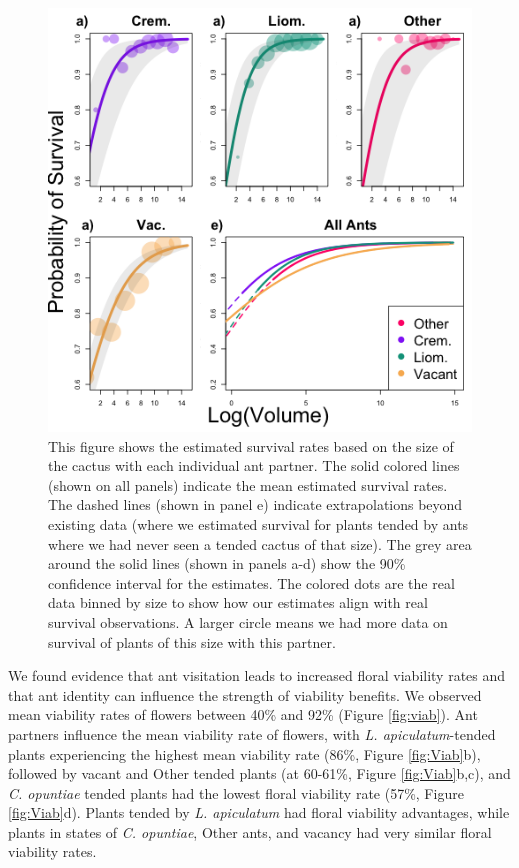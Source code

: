 \documentclass[11pt]{article}
\begin{document}
\begin{figure}[H]
\includegraphics[width=0.95\linewidth]{Figures/survival_plot.png}
\caption{This figure shows the estimated survival rates based on the size of the cactus with each individual ant partner. The solid colored lines (shown on all panels) indicate the mean estimated survival rates. The dashed lines (shown in panel e) indicate extrapolations beyond existing data (where we estimated survival for plants tended by ants where we had never seen a tended cactus of that size). The grey area around the solid lines (shown in panels a-d) show the 90\% confidence interval for the estimates. The colored dots are the real data binned by size to show how our estimates align with real survival observations. A larger circle means we had more data on survival of plants of this size with this partner.}
\label{fig:Surv}
\end{figure}

We found evidence that ant visitation leads to increased floral viability rates and that ant identity can influence the strength of viability benefits.
We observed mean viability rates of flowers between 40\% and 92\% (Figure \ref{fig:viab}).
Ant partners influence the mean viability rate of flowers, with \textit{L. apiculatum}-tended plants experiencing the highest mean viability rate (86\%, Figure \ref{fig:Viab}b), followed by vacant and Other tended plants (at 60-61\%, Figure \ref{fig:Viab}b,c), and \textit{C. opuntiae} tended plants had the lowest floral viability rate (57\%, Figure \ref{fig:Viab}d).
Plants tended by \textit{L. apiculatum} had floral viability advantages, while plants in states of \textit{C. opuntiae}, Other ants, and vacancy had very similar floral viability rates. 
\end{document}
